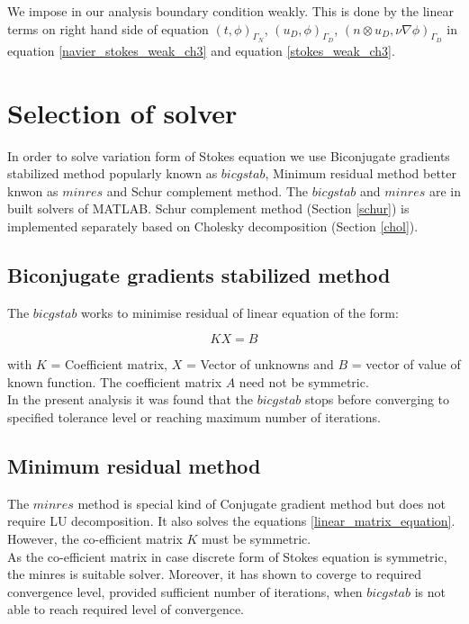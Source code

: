 \documentclass[a4paper,12pt]{book}
\begin{document}
We impose in our analysis boundary condition weakly. This is done by the linear terms on right hand side of equation  $(t,\phi)_{\Gamma_N}$, $(u_D,\phi)_{\Gamma_D}$, $(n \otimes u_D, \nu \nabla \phi)_{\Gamma_D}$ in equation \ref{navier_stokes_weak_ch3} and equation \ref{stokes_weak_ch3}.

\section{Selection of solver}

In order to solve variation form of Stokes equation we use Biconjugate gradients stabilized method popularly known as $bicgstab$, Minimum residual method better knwon as $minres$ and Schur complement method. The $bicgstab$ and $minres$ are in built solvers of MATLAB. Schur complement method (Section \ref{schur}) is implemented separately based on Cholesky decomposition (Section \ref{chol}).

\subsection{Biconjugate gradients stabilized method}

The $bicgstab$ works to minimise residual of linear equation of the form:

\begin{equation} \label{linear_matrix_equation}
KX = B
\end{equation}

with $K$ = Coefficient matrix, $X$ = Vector of unknowns and $B$ = vector of value of known function. The coefficient matrix $A$ need not be symmetric. \\

In the present analysis it was found that the $bicgstab$ stops before converging to specified tolerance level or reaching maximum number of iterations. 

\subsection{Minimum residual method} 

The $minres$ method is special kind of Conjugate gradient method but does not require LU decomposition. It also solves the equations \ref{linear_matrix_equation}. However, the co-efficient matrix $K$ must be symmetric. \\

As the co-efficient matrix in case discrete form of Stokes equation is symmetric, the minres is suitable solver. Moreover, it has shown to coverge to required convergence level, provided sufficient number of iterations, when $bicgstab$ is not able to reach required level of convergence.
\end{document}
